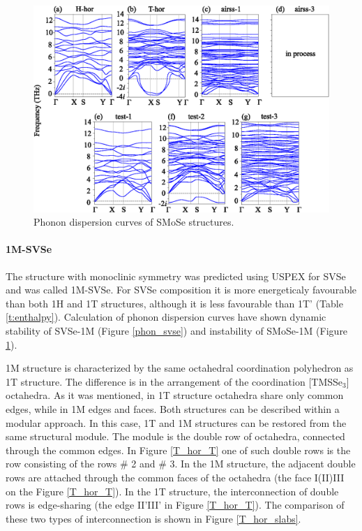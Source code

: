 \documentclass[a4paperm]{article}
\begin{document}
\begin{figure}[H]
	\includegraphics[width=\textwidth]{phon_smose.eps}
	\caption{Phonon dispersion curves of SMoSe structures.}
	\label{phon_smose}
\end{figure}







\paragraph{1M-SVSe}

The structure with monoclinic symmetry was predicted using USPEX for SVSe and was called 1M-SVSe. 
For SVSe composition it is more  energeticaly favourable than both 1H and 1T structures, although it is less favourable than 1T' (Table \ref{t:enthalpy}).
Calculation of phonon dispersion curves have shown dynamic stability of SVSe-1M (Figure \ref{phon_svse}) and instability of SMoSe-1M (Figure \ref{phon_smose}).

1M structure is characterized by the same octahedral coordination polyhedron as 1T structure.
The difference is in the arrangement of the coordination [TMSSe$_3$] octahedra.
As it was mentioned, in 1T structure octahedra share only common edges, while in 1M edges and faces.
Both structures can be described within a modular approach.
In this case, 1T and 1M structures can be restored from the same structural module.
The module is the double row of octahedra, connected through the common edges.
In Figure \ref{T_hor_T} one of such double rows is the row consisting of the rows \# 2 and \# 3.
In the 1M structure, the adjacent double rows are attached through the common faces  of the octahedra (the face I(II)III on the Figure \ref{T_hor_T}).
In the 1T structure, the interconnection of double rows is edge-sharing (the edge II'III' in Figure \ref{T_hor_T}). 
The comparison of these two types of interconnection is shown in Figure \ref{T_hor_slabs}.
\end{document}
